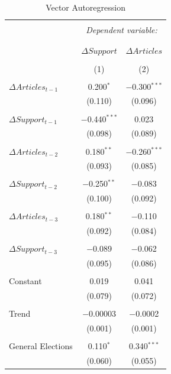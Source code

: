\documentclass[12pt,article]{article}
\begin{document}
\begin{table}[!htbp] \centering 
  \caption{Vector Autoregression} 
  \label{} 
\begin{tabular}{@{\extracolsep{5pt}}lcc} 
\\[-1.8ex]\hline 
\hline \\[-1.8ex] 
 & \multicolumn{2}{c}{\textit{Dependent variable:}} \\ 
\cline{2-3} 
\\[-1.8ex] & \multicolumn{2}{c}{} \\ 
 & $\Delta Support$ & $\Delta Articles$ \\ 
\\[-1.8ex] & (1) & (2)\\ 
\hline \\[-1.8ex] 
 $\Delta Articles_{t-1}$ & 0.200$^{*}$ & $-$0.300$^{***}$ \\ 
  & (0.110) & (0.096) \\ 
  & & \\ 
 $\Delta Support_{t-1}$ & $-$0.440$^{***}$ & 0.023 \\ 
  & (0.098) & (0.089) \\ 
  & & \\ 
 $\Delta Articles_{t-2}$ & 0.180$^{**}$ & $-$0.260$^{***}$ \\ 
  & (0.093) & (0.085) \\ 
  & & \\ 
 $\Delta Support_{t-2}$ & $-$0.250$^{**}$ & $-$0.083 \\ 
  & (0.100) & (0.092) \\ 
  & & \\ 
 $\Delta Articles_{t-3}$ & 0.180$^{**}$ & $-$0.110 \\ 
  & (0.092) & (0.084) \\ 
  & & \\ 
 $\Delta Support_{t-3}$ & $-$0.089 & $-$0.062 \\ 
  & (0.095) & (0.086) \\ 
  & & \\ 
 Constant & 0.019 & 0.041 \\ 
  & (0.079) & (0.072) \\ 
  & & \\ 
 Trend & $-$0.00003 & $-$0.0002 \\ 
  & (0.001) & (0.001) \\ 
  & & \\ 
 General Elections & 0.110$^{*}$ & 0.340$^{***}$ \\ 
  & (0.060) & (0.055) \\ 

\end{tabular}
\end{table}
\end{document}
